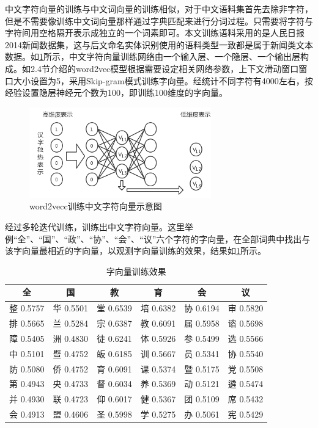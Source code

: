 \documentclass[winfonts,master,oneside,nobackinfo]{njuthesis}
\begin{document}
中文字符向量的训练与中文词向量的训练相似，对于中文语料集首先去除非字符，但是不需要像训练中文词向量那样通过字典匹配来进行分词过程。只需要将字符与字符间用空格隔开表示成独立的一个词素即可。本文训练语料采用的是人民日报2014新闻数据集，这与后文命名实体识别使用的语料类型一致都是属于新闻类文本数据。如\ref{char2vec}所示，中文字符向量训练网络由一个输入层、一个隐层、一个输出层构成。如2.4节介绍的word2vec模型根据需要设定相关网络参数，上下文滑动窗口窗口大小设置为5，采用Skip-gram模式训练字向量。经统计不同字符有4000左右，按经验设置隐层神经元个数为100，即训练100维度的字向量。

\begin{figure}[h]
\centering
\includegraphics[width=0.7\textwidth]{./figure/char2vec.jpg}
\caption{word2vecc训练中文字符向量示意图}
\label{char2vec}
\end{figure}

经过多轮迭代训练，训练出中文字符向量。这里举例“全”、“国”、“政”、“协”、“会”、“议”六个字符的字向量，在全部词典中找出与该字向量最相近的字向量，以观测字向量训练的效果，结果如\ref{char_embedding}所示。

\begin{table}[h]
\centering
\begin{tabular}{cccccc} %
\hline 
全& 国& 教& 育& 会& 议\\
\hline  
整 0.5757& 华 0.5501& 堂 0.6539& 培 0.6382&协 0.6194&审 0.5820\\
排 0.5665& 兰 0.5284& 宗 0.6387& 教 0.6091&届 0.5958&谘 0.5698\\
障 0.5405& 洲 0.4830& 徒 0.6241& 体 0.5926&参 0.5499&选 0.5566\\
中 0.5101& 暨 0.4752& 皈 0.6185& 训 0.5667&员 0.5341&协 0.5540\\
防 0.5080& 侨 0.4752& 育 0.6091& 课 0.5374&暨 0.5175&党 0.5508\\
第 0.4943& 央 0.4733& 督 0.6034& 养 0.5369&动 0.5121&遴 0.5474\\
并 0.4930& 联 0.4723& 仰 0.6017& 健 0.5367&团 0.5109&席 0.5432\\
会 0.4913& 盟 0.4606& 圣 0.5998& 学 0.5275&办 0.5061&宪 0.5429\\
\hline 
\end{tabular}
\caption{字向量训练效果}
\label{char_embedding}
\end{table}
\end{document}
